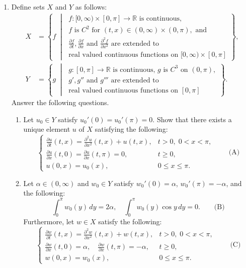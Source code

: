 \documentclass{article}
\begin{document}
\begin{enumerate}[label=\fbox{\arabic*}]
  \item Define sets $X$ and $Y$ as follows:
        \begin{align*}
          X & = \left\{ f \;\middle|\; \begin{array}{l} f: [0, \infty) \times [0, \pi] \to \mathbb{R} \text{ is continuous, } \\ f \text{ is } C^2 \text{ for } (t, x) \in (0, \infty) \times (0, \pi), \text{ and} \\ \frac{\partial f}{\partial t}, \frac{\partial f}{\partial x} \text{ and } \frac{\partial^2 f}{\partial x^2} \text{ are extended to} \\ \text{real valued continuous functions on } [0, \infty) \times [0, \pi] \end{array} \right\}, \\
          Y & = \left\{ g \;\middle|\; \begin{array}{l} g: [0, \pi] \to \mathbb{R} \text{ is continuous, } g \text{ is } C^3 \text{ on } (0, \pi), \\ g', g'' \text{ and } g''' \text{ are extended to} \\ \text{real valued continuous functions on } [0, \pi] \end{array} \right\}.
        \end{align*}
        Answer the following questions.
        \begin{enumerate}[label=(\arabic*)]
          \item Let $u_0 \in Y$ satisfy $u_0'(0) = u_0'(\pi) = 0$. Show that there exists a unique element $u$ of $X$ satisfying the following:
                \[
                  \begin{cases} \frac{\partial u}{\partial t}(t, x) = \frac{\partial^2 u}{\partial x^2}(t, x) + u(t, x), & t > 0, \; 0 < x < \pi, \\ \frac{\partial u}{\partial x}(t, 0) = \frac{\partial u}{\partial x}(t, \pi) = 0, & t \ge 0, \\ u(0, x) = u_0(x), & 0 \le x \le \pi. \end{cases} \qquad \text{(A)}
                \]
          \item Let $\alpha \in (0, \infty)$ and $w_0 \in Y$ satisfy $w_0'(0) = \alpha$, $w_0'(\pi) = -\alpha$, and the following:
                \[
                  \int_0^\pi w_0(y) \, dy = 2\alpha, \quad \int_0^\pi w_0(y) \cos y \, dy = 0. \qquad \text{(B)}
                \]
                Furthermore, let $w \in X$ satisfy the following:
                \[
                  \begin{cases} \frac{\partial w}{\partial t}(t, x) = \frac{\partial^2 w}{\partial x^2}(t, x) + w(t, x), & t > 0, \; 0 < x < \pi, \\ \frac{\partial w}{\partial x}(t, 0) = \alpha, \quad \frac{\partial w}{\partial x}(t, \pi) = -\alpha, & t \ge 0, \\ w(0, x) = w_0(x), & 0 \le x \le \pi. \end{cases} \qquad \text{(C)}
\]
\end{enumerate}
\end{enumerate}
\end{document}
